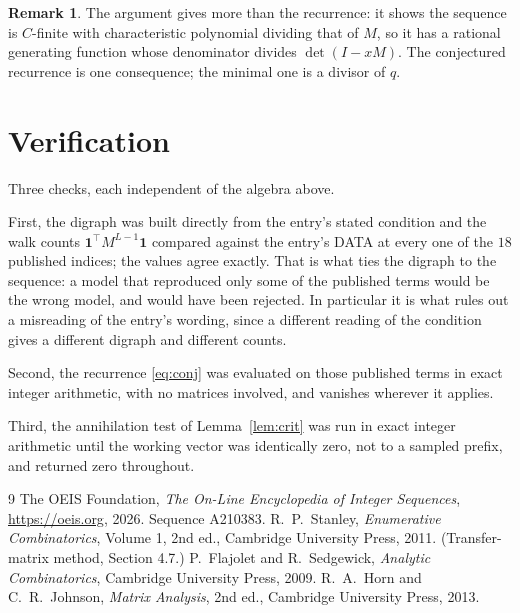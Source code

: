 \documentclass[11pt,a4paper]{article}
\theoremstyle{plain}
\theoremstyle{definition}
\newtheorem{remark}[theorem]{Remark}
\begin{document}
\begin{remark}
The argument gives more than the recurrence: it shows the sequence is $C$-finite with
characteristic polynomial dividing that of $M$, so it has a rational generating function
whose denominator divides $\det(I-xM)$. The conjectured recurrence is one consequence; the
minimal one is a divisor of $q$.
\end{remark}

\section{Verification}

Three checks, each independent of the algebra above.

First, the digraph was built directly from the entry's stated condition and the walk counts
$\mathbf{1}^{\!\top}M^{L-1}\mathbf{1}$ compared against the entry's DATA at
every one of the $18$ published indices; the values agree exactly. That is what ties
the digraph to the sequence: a model that reproduced only some of the published terms would
be the wrong model, and would have been rejected. In particular it is what rules out a
misreading of the entry's wording, since a different reading of the condition gives a
different digraph and different counts.

Second, the recurrence \eqref{eq:conj} was evaluated on those published terms in exact
integer arithmetic, with no matrices involved, and vanishes wherever it applies.

Third, the annihilation test of Lemma~\ref{lem:crit} was run in exact integer arithmetic
until the working vector was identically zero, not to a sampled prefix, and returned zero
throughout.

\begin{thebibliography}{9}
 The OEIS Foundation, \emph{The On-Line Encyclopedia of Integer
Sequences}, \url{https://oeis.org}, 2026. Sequence A210383.
 R.~P.~Stanley, \emph{Enumerative Combinatorics}, Volume 1, 2nd ed.,
Cambridge University Press, 2011. (Transfer-matrix method, Section 4.7.)
 P.~Flajolet and R.~Sedgewick, \emph{Analytic Combinatorics}, Cambridge
University Press, 2009.
 R.~A.~Horn and C.~R.~Johnson, \emph{Matrix Analysis}, 2nd ed., Cambridge
University Press, 2013.
\end{thebibliography}
\end{document}
